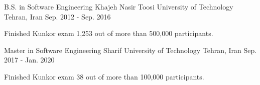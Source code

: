 

\begin{cventries}

  \cventry
    {B.S. in Software Engineering} %
    {Khajeh Nasir Toosi University of Technology} %
    {Tehran, Iran} %
    {Sep. 2012 - Sep. 2016} %
    {
      \begin{cvitems} %
      	\item {Finished Kunkor exam 1,253 out of more than 500,000 participants.}
      \end{cvitems}
    }



\cventry
{Master in Software Engineering} %
{Sharif University of Technology} %
{Tehran, Iran} %
{Sep. 2017 - Jan. 2020} %
{
	\begin{cvitems} %
		\item {Finished Kunkor exam 38 out of more than 100,000 participants.}
	\end{cvitems}
}

\end{cventries}
